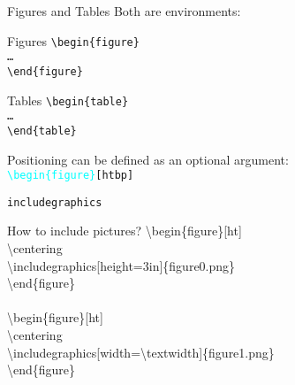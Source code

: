 
\begin{frame}{Figures and Tables}
Both are environments:
\begin{block}{Figures}
\hspace{1cm}\texttt{\textbackslash begin\{figure\} \\
\hspace{1.5cm}\ldots \\
\hspace{1cm}\textbackslash end\{figure\}}
\end{block}
\begin{block}{Tables}
\hspace{1cm}\texttt{\textbackslash begin\{table\} \\
\hspace{1.5cm}\ldots \\
\hspace{1cm}\textbackslash end\{table\}}
\end{block}
Positioning can be defined as an optional argument: \\
\hspace{1cm}\texttt{\textcolor{cyan}{\textbackslash begin\{figure\}}[htbp]}
\end{frame}

\begin{frame}{\texttt{includegraphics}}
\begin{block}{How to include pictures?}
%
\hspace{1cm}\textbackslash begin\{figure\}[ht] \\
\hspace{1.5cm}\textbackslash centering \\
\hspace{1.5cm}\textbackslash includegraphics[height=3in]\{figure0.png\} \\
\hspace{1cm}\textbackslash end\{figure\} \\
~\\
\hspace{1cm}\textbackslash begin\{figure\}[ht] \\
\hspace{1.5cm}\textbackslash centering \\
\hspace{1.5cm}\textbackslash includegraphics[width=\textbackslash textwidth]\{figure1.png\} \\
\hspace{1cm}\textbackslash end\{figure\}

\end{block}
\end{frame}

